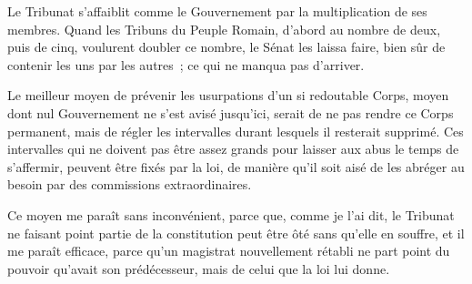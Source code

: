 \documentclass[french,twoside]{book} %
\begin{document}
Le Tribunat s’affaiblit comme le Gouvernement par la multiplication de ses membres. Quand les Tribuns du Peuple Romain, d’abord au nombre de deux, puis de cinq, voulurent doubler ce nombre, le Sénat les laissa faire, bien sûr de contenir les uns par les autres ; ce qui ne manqua pas d’arriver.\par
Le meilleur moyen de prévenir les usurpations d’un si redoutable Corps, moyen dont nul Gouvernement ne s’est avisé jusqu’ici, serait de ne pas rendre ce Corps permanent, mais de régler les intervalles durant lesquels il resterait supprimé. Ces intervalles qui ne doivent pas être assez grands pour laisser aux abus le temps de s’affermir, peuvent être fixés par la loi, de manière qu’il soit aisé de les abréger au besoin par des commissions extraordinaires.\par
Ce moyen me paraît sans inconvénient, parce que, comme je l’ai dit, le Tribunat ne faisant point partie de la constitution peut être ôté sans qu’elle en souffre, et il me paraît efficace, parce qu’un magistrat nouvellement rétabli ne part point du pouvoir qu’avait son prédécesseur, mais de celui que la loi lui donne.
\end{document}
